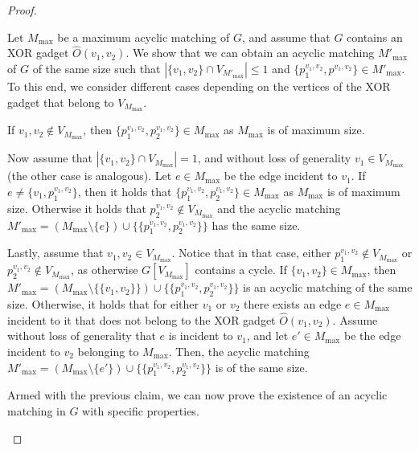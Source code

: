 \begin{proof}
\begin{nestedproof}
            \begin{claimproof}
                Let $M_{\max}$ be a maximum acyclic matching of $G$, and assume that $G$ contains an XOR gadget $\hat{O}(v_1,v_2)$.
                We show that we can obtain an acyclic matching $M'_{\max}$ of $G$ of the same size
                such that $|\{v_1,v_2\} \cap V_{M'_{\max}}| \le 1$ and $\{p^{v_1,v_2}_1,p^{v_1,v_2}\} \in M'_{\max}$.
                To this end, we consider different cases depending on the vertices of the XOR gadget that belong to $V_{M_{\max}}$.

                If $v_1,v_2 \notin V_{M_{\max}}$, then $\{p^{v_1,v_2}_1,p^{v_1,v_2}_2\} \in M_{\max}$ as
                $M_{\max}$ is of maximum size.

                Now assume that $|\{v_1,v_2\} \cap V_{M_{\max}}| = 1$, and without loss of generality $v_1 \in V_{M_{\max}}$ (the other case is analogous).
                Let $e \in M_{\max}$ be the edge incident to $v_1$.
                If $e \neq \{v_1,p^{v_1,v_2}_1\}$, then it holds that $\{p^{v_1,v_2}_1,p^{v_1,v_2}_2\} \in M_{\max}$ as $M_{\max}$ is of maximum size.
                Otherwise it holds that $p^{v_1,v_2}_2 \notin V_{M_{\max}}$ and the acyclic matching $M'_{\max} = (M_{\max} \setminus \{e\}) \cup \{\{p^{v_1,v_2}_1,p^{v_1,v_2}_2\}\}$
                has the same size.

                Lastly, assume that $v_1,v_2 \in V_{M_{\max}}$.
                Notice that in that case, either $p^{v_1,v_2}_1 \notin V_{M_{\max}}$ or $p^{v_1,v_2}_2 \notin V_{M_{\max}}$, as otherwise $G[V_{M_{\max}}]$
                contains a cycle.
                If $\{v_1,v_2\} \in M_{\max}$, then $M'_{\max} = (M_{\max} \setminus \{\{v_1,v_2\}\}) \cup \{\{p^{v_1,v_2}_1,p^{v_1,v_2}_2\}\}$
                is an acyclic matching of the same size.
                Otherwise, it holds that for either $v_1$ or $v_2$ there exists an edge $e \in M_{\max}$ incident to it
                that does not belong to the XOR gadget $\hat{O}(v_1,v_2)$.
                Assume without loss of generality that $e$ is incident to $v_1$, and let $e' \in M_{\max}$ be the edge incident to $v_2$ belonging to $M_{\max}$.
                Then, the acyclic matching $M'_{\max} = (M_{\max} \setminus \{e'\}) \cup \{\{p^{v_1,v_2}_1,p^{v_1,v_2}_2\}\}$ is of the same size.
            \end{claimproof}


            Armed with the previous claim, we can now prove the existence of an acyclic matching in $G$ with specific properties.


\end{nestedproof}
\end{proof}
